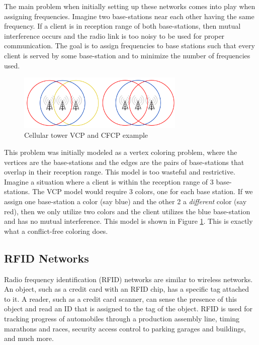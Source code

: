 \documentclass{sig-alternate}
\begin{document}
The main problem when initially setting up these networks comes into play when assigning frequencies. Imagine two base-stations near each other having the same frequency. If a client is in reception range of both base-stations, then mutual interference occurs and the radio link is too noisy to be used for proper communication. The goal is to assign frequencies to base stations such that every client is served by some base-station and to minimize the number of frequencies used.

\begin{figure}[h]
	\centering
	\includegraphics[width=8cm,trim=4 4 4 4,clip]{../figures/towers.pdf}
	\caption{Cellular tower VCP and CFCP example}\label{fig:towers}
\end{figure}

This problem was initially modeled as a vertex coloring problem, where the vertices are the base-stations and the edges are the pairs of base-stations that overlap in their reception range. This model is too wasteful and restrictive. Imagine a situation where a client is within the reception range of 3 base-stations. The VCP model would require 3 colors, one for each base station. If we assign one base-station a color (say blue) and the other 2 a \emph{different} color (say red), then we only utilize two colors and the client utilizes the blue base-station and has no mutual interference. This model is shown in Figure \ref{fig:towers}. This is exactly what a conflict-free coloring does. \cite{smorodinsky2013conflict}

\subsection{RFID Networks}
Radio frequency identification (RFID) networks are similar to wireless networks. An object, such as a credit card with an RFID chip, has a specific tag attached to it. A reader, such as a credit card scanner, can sense the presence of this object and read an ID that is assigned to the tag of the object. RFID is used for tracking progress of automobiles through a production assembly line, timing marathons and races, security access control to parking garages and buildings, and much more.
\end{document}
